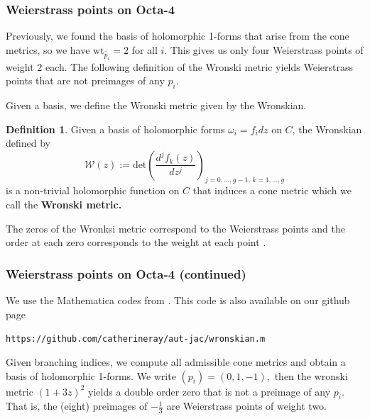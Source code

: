 \documentclass[12pt,reqno]{amsart}
\DeclareMathOperator{\Aut}{Aut}
\newtheorem*{proposition}{Proposition}
\theoremstyle{definition}
\newtheorem{defn}{Definition}
\theoremstyle{remark}
\begin{document}

\subsubsection*{Weierstrass points on Octa-4} Previously, we found the basis of holomorphic 1-forms that arise from the cone metrics, so we have $\textrm{wt}_{\widetilde{p_i}} = 2$ for all $i.$ This gives us only four Weierstrass points of weight 2 each. The following definition of the Wronski metric yields Weierstrass points that are not preimages of any $p_i.$

Given a basis, we define the Wronski metric given by the Wronskian.

\begin{defn}\label{def: wronski} Given a basis of holomorphic forms $\omega_i = f_i d z$ on $C$, the Wronskian defined by $$\mathcal{W}(z) := \textrm{det} \left( \frac{d^j f_k(z)}{d z^j} \right)_{j = 0, \ldots , g - 1, \, k = 1, \ldots , g}$$ is a non-trivial holomorphic function on $C$ that induces a cone metric which we call the \textbf{Wronski metric.} \end{defn}

The zeros of the Wronksi metric correspond to the Weierstrass points and the order at each zero corresponds to the weight at each point \cite{fk}. 

\subsubsection*{Weierstrass points on Octa-4 (continued)} We use the Mathematica codes from \cite{dthesis}. This code is also available on our github page \begin{center}\texttt{https://github.com/catherineray/aut-jac/wronskian.m}\end{center} Given branching indices, we compute all admissible cone metrics and obtain a basis of holomorphic 1-forms. We write $(p_i) = (0, 1, -1),$ then the wronski metric $(1 + 3 z)^2$ yields a double order zero that is not a preimage of any $p_i.$ That is, the (eight) preimages of $- \frac{1}{3}$ are Weierstrass points of weight two. 
\end{document}
